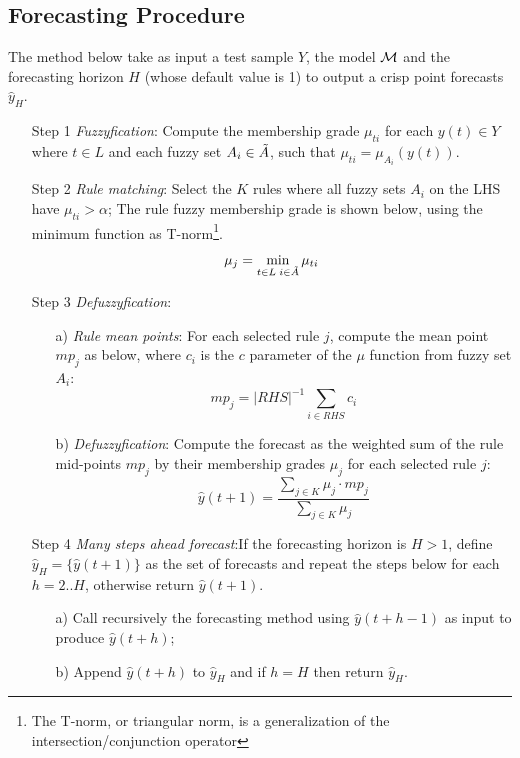 %
\subsection{Forecasting Procedure}  
\label{sec:fts_forecasting_procedure}

The method below take as input a test sample $Y$, the model $\mathcal{M}$ and the forecasting horizon $H$ (whose default value is 1) to output a crisp point forecasts $\hat{y}_H$.

\begin{enumerate}
\item [Step 1] \textit{Fuzzyfication}: Compute the membership grade $\mu_{ti}$ for each $y(t) \in Y$ where $t \in L$ and each fuzzy set $A_i \in \Tilde{A}$, such that $\mu_{ti} = \mu_{A_i}(y(t))$.

\item [Step 2] \textit{Rule matching}: Select the $K$ rules where all fuzzy sets $A_i$ on the LHS have $\mu_{ti} > \alpha$; The rule fuzzy membership grade is shown below, using the minimum function as T-norm\footnote{The T-norm, or triangular norm, is a generalization of the intersection/conjunction operator}.
\begin{equation}
    \mu_j = \min_{t\in L\; i \in \Tilde{A}} \mu_{ti}
\end{equation}
\item [Step 3] \textit{Defuzzyfication}: 
\begin{enumerate}
\item [a)] \textit{Rule mean points}: For each selected rule $j$, compute the mean point $mp_j$ as below, where $c_{i}$ is the $c$ parameter of the $\mu$ function from fuzzy set $A_i$:
\begin{equation}
mp_j = |RHS|^{-1}\sum_{i \in RHS} c_i
\end{equation}
\item [b)] \textit{Defuzzyfication}: Compute the forecast as the weighted sum of the rule mid-points $mp_j$ by their membership grades $\mu_j$ for each selected rule $j$:
\begin{equation}
\hat{y}(t+1) = \frac{\sum_{j \in K} \mu_j \cdot mp_j}{\sum_{j \in K} \mu_j}
\end{equation}
\end{enumerate}
\item[Step 4] \textit{Many steps ahead forecast}:If the forecasting horizon is $H > 1$, define $\hat{y}_H = \{\hat{y}(t+1)\}$ as the set of forecasts and repeat the steps below for each $h=2..H$, otherwise return  $\hat{y}(t+1)$.
\begin{enumerate}
    \item[a)]  Call recursively the forecasting method using $\hat{y}(t+h-1)$ as input to produce $\hat{y}(t+h)$;
    \item[b)] Append $\hat{y}(t+h)$ to $\hat{y}_H$ and if $h = H$ then return $\hat{y}_H$.
\end{enumerate}
\end{enumerate}



